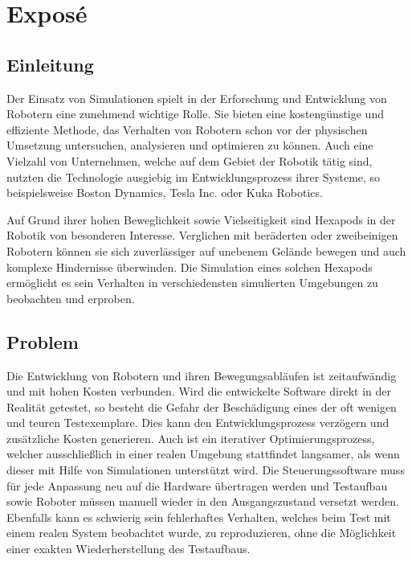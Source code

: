 \chapter{Exposé}
\label{ch:expose}



\section{Einleitung}
Der Einsatz von Simulationen spielt in der Erforschung und Entwicklung von Robotern eine zunehmend wichtige Rolle\parencite{afzal2020study}. 
Sie bieten eine kostengünstige und effiziente Methode, das Verhalten von Robotern schon vor der physischen Umsetzung untersuchen, analysieren und optimieren zu können\parencite{de2019analysis}. 
Auch eine Vielzahl von Unternehmen, welche auf dem Gebiet der Robotik tätig sind, nutzten die Technologie ausgiebig im Entwicklungsprozess ihrer Systeme, so beispielsweise Boston Dynamics\parencite{BostonDynamicsSimulation}, Tesla Inc.\parencite{TeslaAiDay2022} oder Kuka Robotics\parencite{KukaSim}.

Auf Grund ihrer hohen Beweglichkeit sowie Vielseitigkeit sind Hexapods in der Robotik von besonderen Interesse. 
Verglichen mit beräderten oder zweibeinigen Robotern können sie sich zuverlässiger auf unebenem Gelände bewegen und auch komplexe Hindernisse überwinden\parencite{barai2013smart, atifystructure}.
Die Simulation eines solchen Hexapods ermöglicht es sein Verhalten in verschiedensten simulierten Umgebungen zu beobachten und erproben.

\section{Problem}

Die Entwicklung von Robotern und ihren Bewegungsabläufen ist zeitaufwändig und mit hohen Kosten verbunden\parencite{ahmadian2005model}.
Wird die entwickelte Software direkt in der Realität getestet, so besteht die Gefahr der Beschädigung eines der oft wenigen und teuren Testexemplare.
Dies kann den Entwicklungsprozess verzögern und zusätzliche Kosten generieren.
Auch ist ein iterativer Optimierungsprozess, welcher ausschließlich in einer realen Umgebung stattfindet langsamer, als wenn dieser mit Hilfe von Simulationen unterstützt wird.
Die Steuerungssoftware muss für jede Anpassung neu auf die Hardware übertragen werden und Testaufbau sowie Roboter müssen manuell wieder in den Ausgangszustand versetzt werden.
Ebenfalls kann es schwierig sein fehlerhaftes Verhalten, welches beim Test mit einem realen System beobachtet wurde, zu reproduzieren, ohne die Möglichkeit einer exakten Wiederherstellung des Testaufbaus.


